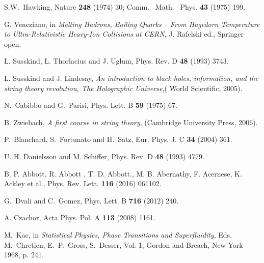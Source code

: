 \documentclass[aps,prd,showkeys,nofootinbib,superscriptaddress]{revtex4-2}
\begin{document}
\begin{thebibliography}{99}
S.W.~Hawking,
Nature {\bf 248} (1974) 30;
Comm. \ Math. \ Phys. {\bf 43} (1975) 199.

G. Veneziano,
in {\it Melting Hadrons, Boiling Quarks – From Hagedorn Temperature to Ultra-Relativistic Heavy-Ion
Collisions at CERN}, J. Rafelski ed., Springer open.

L. Susskind, L. Thorlacius and J. Uglum,
Phys. Rev. D {\bf 48} (1993) 3743.

L. Susskind and J. Lindesay,
{\it An introduction to black holes, information, and the string theory revolution, The Holographic Universe},( World Scientific, 2005).

N.~Cabibbo and G.~Parisi,
Phys. Lett. B \textbf{59} (1975) 67.

B. Zwiebach,
{\it A first course in string theory}, (Cambridge University Press, 2006).

P.~Blanchard, S.~Fortunato and H.~Satz,
Eur. Phys. J. C \textbf{34} (2004) 361.

U. H. Danielsson and M. Schiffer, Phys. Rev. D {\bf 48} (1993) 4779.

B. P. Abbott, R. Abbott , T. D. Abbott., M. B. Abernathy, F. Acernese, K. Ackley et al.,
Phys. Rev. Lett. \textbf{116} (2016) 061102.

G.~Dvali and C.~Gomez,
Phys. Lett. B \textbf{716} (2012) 240.

A. Czachor,
Acta Phys. Pol. A {\bf 113} (2008) 1161.

 M.~Kac, in \textit{Statistical Physics, Phase Transitions and Superfluidity}, Eds. M.~Chretien, E.~P.~Gross, S.~Desser, Vol. 1, Gordon and Breach, New York 1968,
p. 241.

	





\end{thebibliography}
\end{document}
